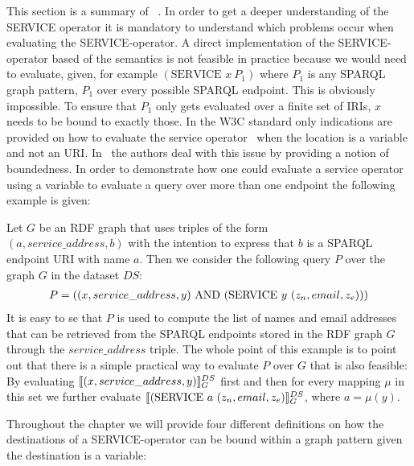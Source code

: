 This section is a summary of ~\cite[p. 4-7]{BuilAranda20131}. In order to get a
deeper understanding of the SERVICE operator it is mandatory to understand which
problems occur when evaluating the SERVICE-operator.
A direct implementation of the SERVICE-operator based of the semantics is not
feasible in practice because we would need to evaluate, given, for example $(\mbox{SERVICE }  x \
P_1)$ where $P_1$ is any SPARQL graph pattern, $P_1$ over every 
possible SPARQL endpoint. This is obviously impossible. To ensure that $P_1$
only gets evaluated over a finite set of IRIs, $x$ needs to be bound to exactly
those. In the W3C standard only indications are provided on how to evaluate the
service operator~\cite{w3standardservice} when the location is a variable and
not an URI. In~\cite{BuilAranda20131} the authors deal with this issue by
providing a notion of boundedness. In order to demonstrate how one could
evaluate a service operator using a variable to evaluate a query over more than
one endpoint the following example is given:
\begin{example}
Let $G$ be an RDF graph that uses triples of the form\\ $(a, service\_address,b)$
with the intention to express that $b$ is a SPARQL endpoint URI with name $a$.
Then we consider the following query $P$ over the graph $G$ in the dataset $DS$:
\begin{align*}
	P=((x, service\_address, y) \AND (\mbox{SERVICE } y \ (z_n,email,z_e)))
\end{align*}
It is easy to se that $P$ is used to compute the list of names and email
addresses that can be retrieved from the SPARQL endpoints stored in the RDF
graph $G$ through the $service\_address$ triple. 
The whole point of this example is to point out that there is a simple practical
way to evaluate $P$ over $G$ that is also feasible:
By evaluating $\llbracket (x,service\_address,y) \rrbracket^{DS}_G$ first and then for every
mapping $\mu$ in this set we further evaluate $\llbracket (\mbox{SERVICE } a \ (z_n, email, z_e)
\rrbracket^{DS}_G$, where $a = \mu(y)$. 
\end{example}
Throughout the chapter we will provide four different definitions on how the
destinations of a SERVICE-operator can be bound within a graph pattern given the
destination is a variable:
